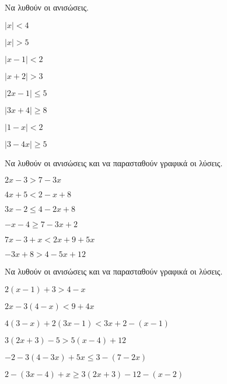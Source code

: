 \documentclass[11pt,a4paper]{article}
\begin{document}
Να λυθούν οι ανισώσεις.
\begin{multicols}{4}
\begin{alist}
\item $ \left|x\right|<4 $
\item $ \left|x\right|>5 $
\item $ \left|x-1\right|<2 $
\item $ \left|x+2\right|>3 $
\item $ \left|2x-1\right|\leq5 $
\item $ \left|3x+4\right|\geq8 $
\item $ \left|1-x\right|<2 $
\item $ \left|3-4x\right|\geq5 $
\end{alist}
\end{multicols}




Να λυθούν οι ανισώσεις και να παρασταθούν γραφικά οι λύσεις.
\begin{multicols}{3}
\begin{alist}
\item $ 2x-3>7-3x $
\item $ 4x+5<2-x+8 $
\item $ 3x-2\leq4-2x+8 $
\item $ -x-4\geq7-3x+2 $
\item $ 7x-3+x<2x+9+5x $
\item $ -3x+8>4-5x+12 $
\end{alist}
\end{multicols}




Να λυθούν οι ανισώσεις και να παρασταθούν γραφικά οι λύσεις.
\begin{multicols}{2}
\begin{alist}
\item $ 2(x-1)+3>4-x $
\item $ 2x-3(4-x)<9+4x $
\item $ 4(3-x)+2(3x-1)<3x+2-(x-1) $
\item $ 3(2x+3)-5>5(x-4)+12 $
\item $ -2-3(4-3x)+5x\leq3-(7-2x) $
\item $ 2-(3x-4)+x\geq3(2x+3)-12-(x-2) $
\end{alist}
\end{multicols}
\end{document}

